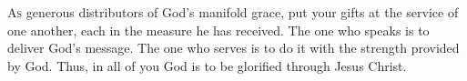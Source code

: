 
\lettrine{A}{s} generous distributors of God’s manifold grace, put your gifts at the service of one another, each in the measure he has received. The one who speaks is to deliver God’s message. The one who serves is to do it with the strength provided by God. Thus, in all of you God is to be glorified through Jesus Christ.